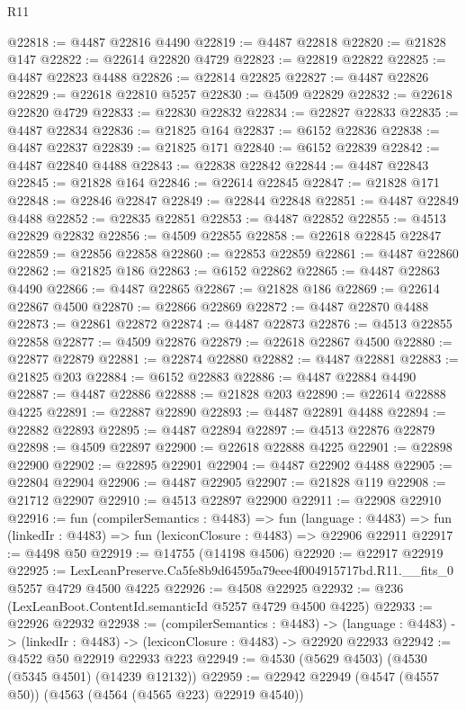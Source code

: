 \begin{lexlean}{R11}
\begin{coremodule}
@22818 := @4487 @22816 @4490
@22819 := @4487 @22818
@22820 := @21828 @147
@22822 := @22614 @22820 @4729
@22823 := @22819 @22822
@22825 := @4487 @22823 @4488
@22826 := @22814 @22825
@22827 := @4487 @22826
@22829 := @22618 @22810 @5257
@22830 := @4509 @22829
@22832 := @22618 @22820 @4729
@22833 := @22830 @22832
@22834 := @22827 @22833
@22835 := @4487 @22834
@22836 := @21825 @164
@22837 := @6152 @22836
@22838 := @4487 @22837
@22839 := @21825 @171
@22840 := @6152 @22839
@22842 := @4487 @22840 @4488
@22843 := @22838 @22842
@22844 := @4487 @22843
@22845 := @21828 @164
@22846 := @22614 @22845
@22847 := @21828 @171
@22848 := @22846 @22847
@22849 := @22844 @22848
@22851 := @4487 @22849 @4488
@22852 := @22835 @22851
@22853 := @4487 @22852
@22855 := @4513 @22829 @22832
@22856 := @4509 @22855
@22858 := @22618 @22845 @22847
@22859 := @22856 @22858
@22860 := @22853 @22859
@22861 := @4487 @22860
@22862 := @21825 @186
@22863 := @6152 @22862
@22865 := @4487 @22863 @4490
@22866 := @4487 @22865
@22867 := @21828 @186
@22869 := @22614 @22867 @4500
@22870 := @22866 @22869
@22872 := @4487 @22870 @4488
@22873 := @22861 @22872
@22874 := @4487 @22873
@22876 := @4513 @22855 @22858
@22877 := @4509 @22876
@22879 := @22618 @22867 @4500
@22880 := @22877 @22879
@22881 := @22874 @22880
@22882 := @4487 @22881
@22883 := @21825 @203
@22884 := @6152 @22883
@22886 := @4487 @22884 @4490
@22887 := @4487 @22886
@22888 := @21828 @203
@22890 := @22614 @22888 @4225
@22891 := @22887 @22890
@22893 := @4487 @22891 @4488
@22894 := @22882 @22893
@22895 := @4487 @22894
@22897 := @4513 @22876 @22879
@22898 := @4509 @22897
@22900 := @22618 @22888 @4225
@22901 := @22898 @22900
@22902 := @22895 @22901
@22904 := @4487 @22902 @4488
@22905 := @22804 @22904
@22906 := @4487 @22905
@22907 := @21828 @119
@22908 := @21712 @22907
@22910 := @4513 @22897 @22900
@22911 := @22908 @22910
@22916 := fun (compilerSemantics : @4483) =>
  fun (language : @4483) => fun (linkedIr : @4483) => fun (lexiconClosure : @4483) => @22906 @22911
@22917 := @4498 @50
@22919 := @14755 (@14198 @4506)
@22920 := @22917 @22919
@22925 := LexLeanPreserve.Ca5fe8b9d64595a79eee4f004915717bd.R11.__fits_0 @5257 @4729 @4500 @4225
@22926 := @4508 @22925
@22932 := @236 (LexLeanBoot.ContentId.semanticId @5257 @4729 @4500 @4225)
@22933 := @22926 @22932
@22938 := (compilerSemantics : @4483) ->
  (language : @4483) -> (linkedIr : @4483) -> (lexiconClosure : @4483) -> @22920 @22933
@22942 := @4522 @50 @22919 @22933 @223
@22949 := @4530 (@5629 @4503) (@4530 (@5345 @4501) (@14239 @12132))
@22959 := @22942 @22949 (@4547 (@4557 @50)) (@4563 (@4564 (@4565 @223) @22919 @4540))

\end{coremodule}
\end{lexlean}
